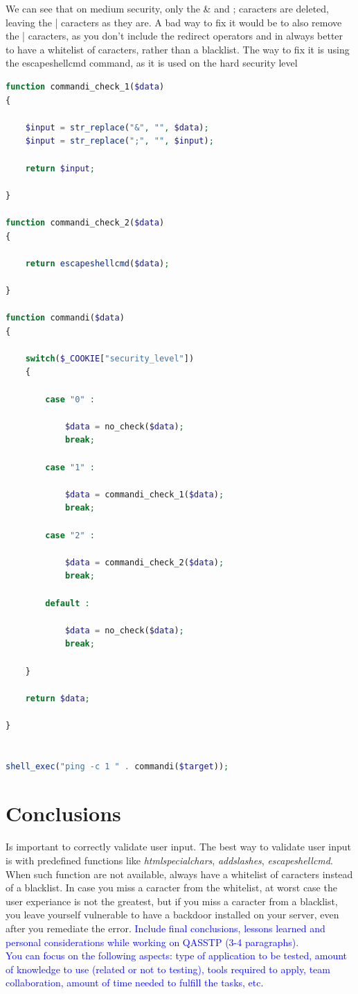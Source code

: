 \documentclass{article}
\begin{document}
We can see that on medium security, only the \& and ; caracters are deleted, leaving the | caracters as they are.
A bad way to fix it would be to also remove the | caracters, as you don't include the redirect operators and in always better to have a whitelist of caracters, rather than a blacklist.
The way to fix it is using the escapeshellcmd command, as it is used on the hard security level
\begin{lstlisting}[language=php,caption={Backdoor Code},label=php:command-injection-code]
function commandi_check_1($data)
{
    
    $input = str_replace("&", "", $data);
    $input = str_replace(";", "", $input);
    
    return $input;
    
}

function commandi_check_2($data)
{
   
    return escapeshellcmd($data);
    
}

function commandi($data)
{

    switch($_COOKIE["security_level"])
    {

        case "0" :

            $data = no_check($data);
            break;

        case "1" :

            $data = commandi_check_1($data);
            break;

        case "2" :

            $data = commandi_check_2($data);
            break;

        default :

            $data = no_check($data);
            break;

    }

    return $data;

}


shell_exec("ping -c 1 " . commandi($target));
\end{lstlisting}


\section{Conclusions}
\label{}

Is important to correctly validate user input. The best way to validate user input is with predefined functions like \textit{htmlspecialchars}, \textit{addslashes}, \textit{escapeshellcmd}.
When such function are not available, always have a whitelist of caracters instead of a blacklist.
In case you miss a caracter from the whitelist, at worst case the user experiance is not the greatest, but if you miss a caracter from a blacklist, you leave yourself vulnerable to have a backdoor installed on your server, even after you remediate the error.
\textcolor{blue}{Include final conclusions, lessons learned and personal considerations while working on QASSTP (3-4 paragraphs).\\
    You can focus on the following aspects: type of application to be tested, amount of knowledge to use (related or not to testing), tools required to apply, team collaboration, amount of time needed to fulfill the tasks, etc.}
\end{document}

